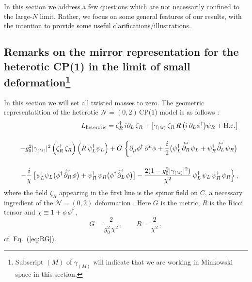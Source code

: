 \documentclass[epsfig,12pt]{article}
\def\beq{\begin{equation}}
\def\eeq{\end{equation}}
\def\beqn{\begin{eqnarray}}
\def\eeqn{\end{eqnarray}}
\newcommand{\nzt}{${\mathcal N}=(0,2)\,$}
\def\beqn{\begin{eqnarray}}
\def\eeqn{\end{eqnarray}}
\def\beq{\begin{equation}}
\def\eeq{\end{equation}}
\newcommand{\wt}{\widetilde}
\newcommand{\ssm}{{\scriptscriptstyle(M)}}
\begin{document}
{In this section we  address a few questions which are not necessarily confined to the large-$N$ limit.
Rather, we focus on some general features of our results, with the intention to provide
some useful clarifications/illustrations.

\subsection[Remarks on the mirror representation
for the heterotic CP(1) in the limit of small deformation]
{Remarks on the mirror representation
for the heterotic CP(1) in the limit of small deformation\footnote{Subscript 
$\ssm$ of $\gamma_\ssm$ will indicate that we are working in Minkowski space in this section.}}



\marginpar{\tiny It's $\gamma = \frac{\wt{\gamma}}{\sqrt{2}g_0}$}

In this section we will set all twisted masses to zero.
The geometric representatition of  the heterotic \nzt CP(1) model is as follows \cite{SY1}:
\beqn
&&
L_{{\rm heterotic}}= 
\zeta_R^\dagger \, i\partial_L \, \zeta_R  + 
\left[\gamma_\ssm \, \zeta_R  \,R\,  \big( i\,\partial_{L}\phi^{\dagger} \big)\psi_R
+{\rm H.c.}\right] \\[4mm]
&&
-g_0^2|\gamma_\ssm |^2 \left(\zeta_R^\dagger\, \zeta_R
\right)\left(R\,  \psi_L^\dagger\psi_L\right)
\nonumber
+
G\, \left\{\rule{0mm}{5mm}
\partial_\mu \phi^\dagger\, \partial^\mu\phi  
+\frac{i}{2}\big(\psi_L^\dagger\!\stackrel{\leftrightarrow}{\partial_R}\!\psi_L 
+ \psi_R^\dagger\!\stackrel{\leftrightarrow}{\partial_L}\!\psi_R
\big)\right.
\nonumber
\\[4mm] 
&&
-\frac{i}{\chi}\,  \big[\psi_L^\dagger \psi_L
\big(\phi^\dagger \!\stackrel{\leftrightarrow}{\partial_R}\!\phi
\big)+ \psi_R^\dagger\, \psi_R
\big(\phi^\dagger\!\stackrel{\leftrightarrow}{\partial_L}\!\phi
\big)
\big]
-
\frac{2(1- g_0^2 |\gamma_\ssm |^2)}{\chi^2}\,\psi_L^\dagger\,\psi_L \,\psi_R^\dagger\,\psi_R
\Big\}\,,
\label{AAone}
\eeqn
where the field $\zeta_R$ appearing in the first line is
the spinor field on $C$, a  necessary ingredient  of the ${\mathcal N}=(0,2)$ deformation
\cite{EdTo}.
Here $G$ is the metric, $R$ is the Ricci tensor and $\chi \equiv 1+\phi\,\phi^\dagger\,,$
\beq
G=
\frac{2}{g_{0}^2\,\chi^{2}}\,,\qquad R =\frac{2}{\chi^2}\,,
\label{fsmetrone}
\eeq
cf. Eq.~(\ref{eq:RG}).

}
\end{document}
